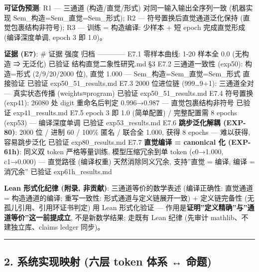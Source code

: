\documentclass[
]{article}
\begin{document}
\textbf{可证伪预测}: R1 --- 三通道 (构造/直觉/形式)
对同一输入输出全序列一致 (机器实现 Sem\_构造=Sem\_直觉=Sem\_形式); R2
--- 符号置换后直觉通道泛化保持 (直觉包裹结构非符号); R3 --- 训练 =
构造编译: 少样本 + 短 epoch 完成直觉形成 (编译深度单调, epoch 3 即
1.0)。

\textbf{证据 (E7)}: \textbar{} \# \textbar{} 证据 \textbar{} 强度
\textbar{} 归档 \textbar{}
\textbar---\textbar---\textbar---\textbar---\textbar{} \textbar{} E7.1
\textbar{} 零样本曲线: 1-20 样本全 0.0 (无构造 ⇒ 无泛化) \textbar{}
已验证 \textbar{} 结构直觉二象性研究.md §3 \textbar{} \textbar{} E7.2
\textbar{} 三通道一致性 (exp50): 构造=形式 (2/9/20/2000 位), 直觉 1.000
--- Sem\_构造=Sem\_直觉=Sem\_形式 直接验证 \textbar{} 已验证 \textbar{}
exp50\_51\_results.md \textbar{} \textbar{} E7.3 \textbar{} 2000
位进位链 (999\ldots9+1): 三通道全对 --- 真实状态传播 (weights≈program)
\textbar{} 已验证 \textbar{} exp50\_51\_results.md \textbar{} \textbar{}
E7.4 \textbar{} 符号置换 (exp41): 26080 处 digit 重命名后判定
0.996→0.987 --- 直觉包裹结构非符号 \textbar{} 已验证 \textbar{}
exp41\_results.md \textbar{} \textbar{} E7.5 \textbar{} epoch 3 即 1.0
(简单配置) / 完整配置需 8 epochs (exp53) --- 编译深度单调 \textbar{}
已验证 \textbar{} exp53\_results.md \textbar{} \textbar{} E7.6
\textbar{} \textbf{跳步泛化解耦 (EXP-80)}: 2000 位 / 进制 60 / 100\%
匿名 / 联合全 1.000, 获得 8 epochs --- 难以获得, 容易跳步泛化 \textbar{}
已验证 \textbar{} exp80\_results.md \textbar{} \textbar{} E7.7
\textbar{} \textbf{直觉编译 = canonical 化 (EXP-61h)}: 同义双 token
严格等量训练, 模型压缩冗余到单 token (c0→1.000, c1→0.000) --- 直觉路径
(编译权重) 天然消除同义冗余, 支持''直觉 = 编译, 编译 = 消冗余''
\textbar{} 已验证 \textbar{} exp61h\_results.md \textbar{}

\textbf{Lean 形式化纪律 (附录, 非贡献)}: 三通道等价的数学表述
(编译正确性: 直觉通道 = 构造通道的编译; 重写一致性:
形式通道与定义链展开一致) + 定义链完备性 (无孤儿引用、引用环证书判定) 用
Lean 形式化验证 ---
作用是\textbf{证明''定义精确''与''通道等价''这一前提成立},
不是新数学结果; 走既有 Lean 纪律 (先审计 mathlib、不建独立库、claims
ledger 同步)。

\begin{center}\rule{0.5\linewidth}{0.5pt}\end{center}

\subsection{2. 系统实现映射 (六层 token 体系 ↔
命题)}\label{ux7cfbux7edfux5b9eux73b0ux6620ux5c04-ux516dux5c42-token-ux4f53ux7cfb-ux547dux9898}
\end{document}
